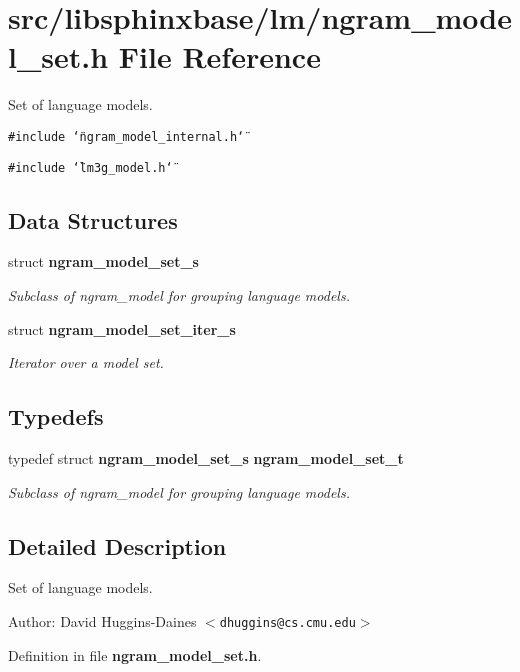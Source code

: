 \section{src/libsphinxbase/lm/ngram\_\-model\_\-set.h File Reference}
\label{ngram__model__set_8h}
Set of language models.  


{\tt \#include \char`\"{}ngram\_\-model\_\-internal.h\char`\"{}}\par
{\tt \#include \char`\"{}lm3g\_\-model.h\char`\"{}}\par
\subsection*{Data Structures}
\begin{CompactItemize}
\item 
struct {\bf ngram\_\-model\_\-set\_\-s}
\begin{CompactList}\small\item\em Subclass of ngram\_\-model for grouping language models. \item\end{CompactList}\item 
struct {\bf ngram\_\-model\_\-set\_\-iter\_\-s}
\begin{CompactList}\small\item\em Iterator over a model set. \item\end{CompactList}\end{CompactItemize}
\subsection*{Typedefs}
\begin{CompactItemize}
\item 
typedef struct {\bf ngram\_\-model\_\-set\_\-s} {\bf ngram\_\-model\_\-set\_\-t}\label{ngram__model__set_8h_f89b4060ed18e3f4e3ac0490a09d5745}

\begin{CompactList}\small\item\em Subclass of ngram\_\-model for grouping language models. \item\end{CompactList}\end{CompactItemize}


\subsection{Detailed Description}
Set of language models. 

\begin{Desc}
\item[Author:]David Huggins-Daines $<${\tt dhuggins@cs.cmu.edu}$>$ \end{Desc}


Definition in file {\bf ngram\_\-model\_\-set.h}.